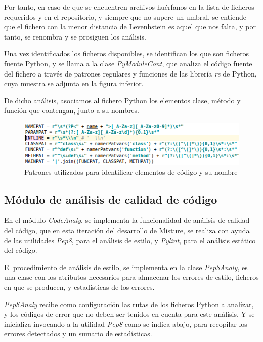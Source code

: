 Por tanto, en caso de que se encuentren archivos huérfanos en la lista de ficheros requeridos y en el repositorio, y siempre que no supere un umbral, se entiende que el fichero con la menor distancia de Levenhstein es aquel que nos falta, y por tanto, se renombra y se prosiguen los análisis.


Una vez identificados los ficheros disponibles, se identifican los que son ficheros fuente Python, y se llama a la clase \textit{PyModuleCont}, que analiza el código fuente del fichero a través de patrones regulares y funciones de las librería \textit{re} de Python, cuya muestra se adjunta en la figura inferior.


De dicho análisis, asociamos al fichero Python los elementos clase, método y función que contengan, junto a su nombres.


\begin{figure}[H]
   \centering
   \includegraphics[width=16cm]{img/Selection_022_pyanaly_regex}
   \caption{Patrones utilizados para identificar elementos de código y su nombre}
   \label{figura:regex}
\end{figure}

\subsection{Módulo de análisis de calidad de código}

En el módulo \textit{CodeAnaly}, se implementa la funcionalidad de análisis de calidad del código, que en esta iteración del desarrollo de Misture, se realiza con ayuda de las utilidades \textit{Pep8}, para el análisis de estilo, y \textit{Pylint}, para el análisis estático del código.


El procedimiento de análisis de estilo, se implementa en la clase \textit{Pep8Analy}, es una clase con los atributos necesarios para almacenar los errores de estilo, ficheros en que se producen, y estadísticas de los errores.


\textit{Pep8Analy}  recibe como configuración las rutas de los ficheros Python a analizar, y los códigos de error que no deben ser tenidos en cuenta para este análisis. Y se inicializa invocando a la utilidad \textit{Pep8} como se indica abajo, para recopilar los errores detectados y un sumario de estadísticas.

